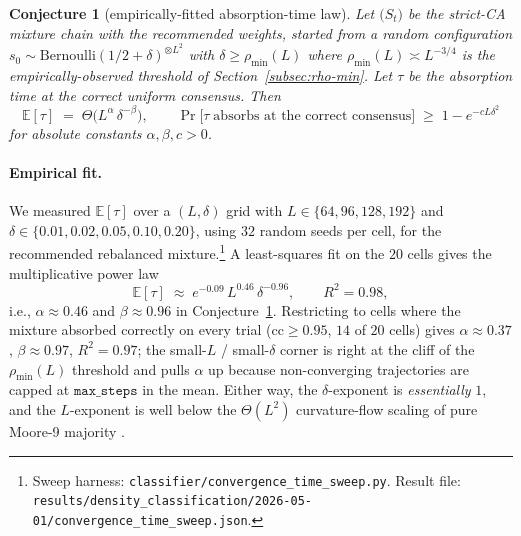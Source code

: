 \documentclass[11pt,a4paper]{article}
\newtheorem{conjecture}{Conjecture}
\newcommand{\fpath}[1]{\nolinkurl{#1}}
\begin{document}
\begin{conjecture}[empirically-fitted absorption-time law]
\label{conj:absorb-time}
Let \(\bigl(S_t\bigr)\) be the strict-CA mixture chain with the
recommended weights, started from a random configuration
\(s_0 \sim \mathrm{Bernoulli}(1/2 + \delta)^{\otimes L^2}\) with
\(\delta \geq \rho_{\min}(L)\) where
\(\rho_{\min}(L) \asymp L^{-3/4}\) is the empirically-observed
threshold of Section~\ref{subsec:rho-min}.  Let \(\tau\) be the
absorption time at the correct uniform consensus.  Then
\[
\mathbb{E}[\tau] \;=\; \Theta\bigl(L^{\alpha}\,\delta^{-\beta}\bigr),
\qquad
\Pr\bigl[\tau \;\text{absorbs at the correct consensus}\bigr]
\;\geq\; 1 - e^{-c L \delta^{2}}
\]
for absolute constants \(\alpha, \beta, c > 0\).
\end{conjecture}

\paragraph{Empirical fit.}
We measured \(\mathbb{E}[\tau]\) over a \((L, \delta)\) grid with
\(L \in \{64, 96, 128, 192\}\) and
\(\delta \in \{0.01, 0.02, 0.05, 0.10, 0.20\}\), using \(32\) random
seeds per cell, for the recommended rebalanced
mixture.\footnote{Sweep harness:
\fpath{classifier/convergence_time_sweep.py}.  Result file:
\fpath{results/density_classification/2026-05-01/convergence_time_sweep.json}.}
A least-squares fit on the \(20\) cells gives the multiplicative
power law
\[
\mathbb{E}[\tau] \;\approx\; e^{-0.09}\,L^{0.46}\,\delta^{-0.96},
\qquad R^{2} = 0.98,
\]
i.e., \(\alpha \approx 0.46\) and \(\beta \approx 0.96\) in
Conjecture~\ref{conj:absorb-time}.  Restricting to cells where the
mixture absorbed correctly on every trial (\(\mathrm{cc} \geq 0.95\),
\(14\) of \(20\) cells) gives \(\alpha \approx 0.37\),
\(\beta \approx 0.97\), \(R^{2} = 0.97\); the small-\(L\) /
small-\(\delta\) corner is right at the cliff of the
\(\rho_{\min}(L)\) threshold and pulls \(\alpha\) up because
non-converging trajectories are capped at \(\mathtt{max\_steps}\)
in the mean.  Either way, the \(\delta\)-exponent is
\emph{essentially} \(1\), and the \(L\)-exponent is well below the
\(\Theta(L^2)\) curvature-flow scaling of pure Moore-9 majority
\cite{FatesRegnault2016}.
\end{document}
